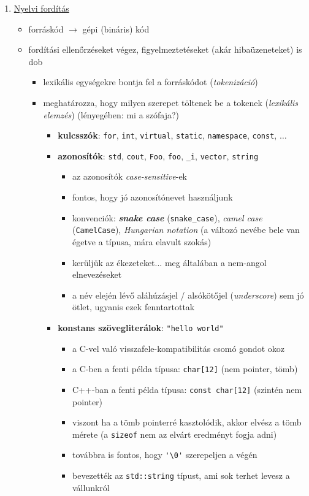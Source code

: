 \documentclass[a4paper, 11pt, oneside]{book}
\begin{document}
\begin{enumerate}[label=\Roman{*}.)]
	\item \underline{Nyelvi fordítás}
	
	\begin{itemize}
		\item forráskód $\to$ gépi (bináris) kód
		\item fordítási ellenőrzéseket végez, figyelmeztetéseket (akár hibaüzeneteket) is dob
		\begin{itemize}
			\item lexikális egységekre bontja fel a forráskódot (\textit{tokenizáció})
			\item meghatározza, hogy milyen szerepet töltenek be a tokenek (\textit{lexikális elemzés}) (lényegében: mi a szófaja?)
			\begin{itemize}
				\item \textbf{kulcsszók}: \verb*|for|, \verb*|int|, \verb*|virtual|, \verb*|static|, \verb*|namespace|, \verb*|const|, $\ldots$
				\item \textbf{azonosítók}: \verb*|std|, \verb*|cout|, \verb*|Foo|, \verb*|foo|, \verb|_i|, \verb*|vector|, \verb*|string|
				
				\begin{itemize}
					\item az azonosítók \textit{case-sensitive}-ek
					\item fontos, hogy jó azonosítónevet használjunk
					\item konvenciók: \textbf{\textit{snake case}} (\verb*|snake_case|), \textit{camel case} (\verb*|CamelCase|), \textit{Hungarian notation} (a változó nevébe bele van égetve a típusa, mára elavult szokás)
					\item kerüljük az ékezeteket... meg általában a nem-angol elnevezéseket
					\item a név elején lévő aláhúzásjel / alsókötőjel (\textit{underscore}) sem jó ötlet, ugyanis ezek fenntartottak
				\end{itemize}
				
				\item \textbf{konstans szövegliterálok}: \verb*|"hello world"|
				
				\begin{itemize}
					\item a C-vel való visszafele-kompatibilitás csomó gondot okoz
					\item a C-ben a fenti példa típusa: \verb|char[12]| (nem pointer, tömb)
					\item C++-ban a fenti példa típusa: \verb|const char[12]| (szintén nem pointer)
					\item viszont ha a tömb pointerré kasztolódik, akkor elvész a tömb mérete (a \verb*|sizeof| nem az elvárt eredményt fogja adni)
					\item továbbra is fontos, hogy \verb|'\0'| szerepeljen a végén
					\item bevezették az \verb*|std::string| típust, ami sok terhet levesz a vállunkról
				\end{itemize}
				

\end{itemize}
\end{itemize}
\end{itemize}
\end{enumerate}
\end{document}
